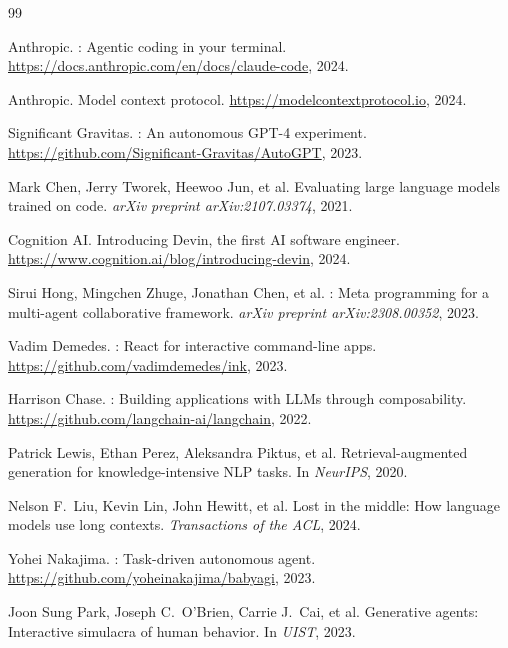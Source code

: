 \documentclass{article}
\begin{document}
\begin{thebibliography}{99}

Anthropic.
: Agentic coding in your terminal.
\newblock \url{https://docs.anthropic.com/en/docs/claude-code}, 2024.

Anthropic.
\newblock Model context protocol.
\newblock \url{https://modelcontextprotocol.io}, 2024.

Significant Gravitas.
: An autonomous {GPT-4} experiment.
\newblock \url{https://github.com/Significant-Gravitas/AutoGPT}, 2023.

Mark Chen, Jerry Tworek, Heewoo Jun, et al.
\newblock Evaluating large language models trained on code.
\newblock \textit{arXiv preprint arXiv:2107.03374}, 2021.

Cognition AI.
\newblock Introducing {Devin}, the first {AI} software engineer.
\newblock \url{https://www.cognition.ai/blog/introducing-devin}, 2024.

Sirui Hong, Mingchen Zhuge, Jonathan Chen, et al.
: Meta programming for a multi-agent collaborative framework.
\newblock \textit{arXiv preprint arXiv:2308.00352}, 2023.

Vadim Demedes.
: React for interactive command-line apps.
\newblock \url{https://github.com/vadimdemedes/ink}, 2023.

Harrison Chase.
: Building applications with {LLMs} through composability.
\newblock \url{https://github.com/langchain-ai/langchain}, 2022.

Patrick Lewis, Ethan Perez, Aleksandra Piktus, et al.
\newblock Retrieval-augmented generation for knowledge-intensive {NLP} tasks.
\newblock In \textit{NeurIPS}, 2020.

Nelson F.\ Liu, Kevin Lin, John Hewitt, et al.
\newblock Lost in the middle: How language models use long contexts.
\newblock \textit{Transactions of the ACL}, 2024.

Yohei Nakajima.
: Task-driven autonomous agent.
\newblock \url{https://github.com/yoheinakajima/babyagi}, 2023.

Joon Sung Park, Joseph C.\ O'Brien, Carrie J.\ Cai, et al.
\newblock Generative agents: Interactive simulacra of human behavior.
\newblock In \textit{UIST}, 2023.


\end{thebibliography}
\end{document}
